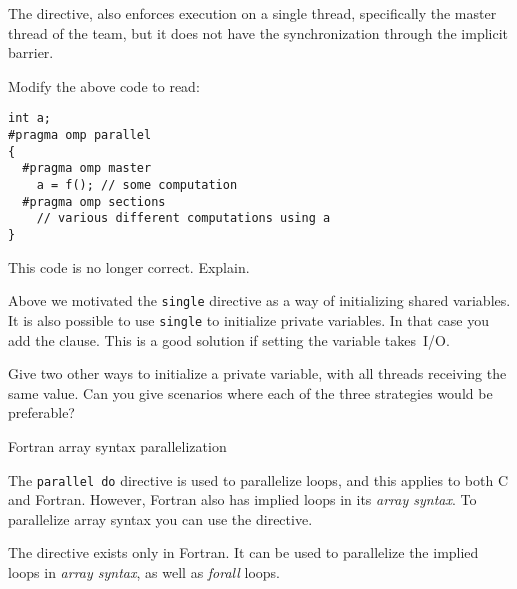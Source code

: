 The  directive, also enforces execution
on a single thread, specifically the master thread of the team,
but it does not have the synchronization through the implicit barrier.

\begin{exercise}
  Modify the above code to read:
\begin{lstlisting}
int a;
#pragma omp parallel
{
  #pragma omp master
    a = f(); // some computation
  #pragma omp sections
    // various different computations using a
}
\end{lstlisting}
  This code is no longer correct. Explain.
\end{exercise}

Above we motivated the \lstinline{single} directive as a way of initializing
shared variables. It is also possible to use \lstinline{single} to initialize
private variables. In that case you add the 
clause. This is a good solution if setting the variable takes~I/O.

\begin{exercise}
  Give two other ways to initialize a private variable, with all
  threads receiving the same value. Can you give scenarios where each
  of the three strategies would be preferable?
\end{exercise}

 {Fortran array syntax parallelization}
\label{sec:fortran-workshare}

The \lstinline{parallel do} directive is used to parallelize loops,
and this applies to both C and Fortran. However, Fortran also
has implied loops in its \emph{array syntax}.
To parallelize array syntax you can use the 
directive.

The  directive exists only in Fortran.
It can be used to parallelize
the implied loops in \emph{array syntax},
as well as  \emph{forall} loops.

